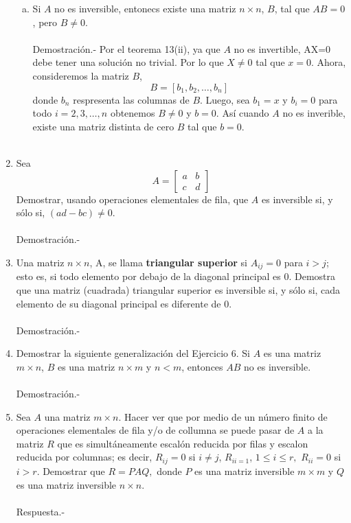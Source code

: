 \begin{enumerate}[\bfseries 1.]
\begin{enumerate}[(a)]
	    \item Si $A$ no es inversible, entonecs existe una matriz $n\times n$, $B$, tal que $AB=0$, pero $B\neq 0$.\\\\
		Demostración.-\; Por el teorema 13(ii), ya que $A$ no es invertible, AX=0 debe tener una solución no trivial. Por lo que $X\neq 0$ tal que $x=0$. Ahora, consideremos la matriz $B$,
		$$B=\left[b_1,b_2,\ldots,b_n\right]$$
		donde $b_n$ respresenta las columnas de $B$. Luego, sea $b_1=x$ y $b_i=0$ para todo $i=2,3,\ldots,n$ obtenemos $B\neq 0$ y $b=0.$ Así cuando $A$ no es inverible, existe una matriz distinta de cero $B$ tal que $b=0$.\\\\

	\end{enumerate}

    \item Sea
    $$
    A=
    \left[
	\begin{array}{rcl}
	    a & b \\
	    c & d
	\end{array}
    \right]
    $$
    Demostrar, usando operaciones elementales de fila, que $A$ es inversible si, y sólo si, $(ad-bc)\neq 0.$\\\\
	Demostración.-\;

    \item Una matriz $n\times n$, A, se llama \textbf{triangular superior} si $A_{ij}=0$ para $i>j$; esto es, si todo elemento por debajo de la diagonal principal es $0$. Demostra que una matriz (cuadrada) triangular superior es inversible si, y sólo si, cada elemento de su diagonal principal es diferente de $0$.\\\\
	Demostración.-\;

    \item Demostrar la siguiente generalización del Ejercicio 6. Si $A$ es una matriz $m\times n$, $B$ es una matriz $n\times m$ y $n<m$, entonces $AB$ no es inversible.\\\\
	Demostración.-\;

    \item Sea $A$ una matriz $m\times n$. Hacer ver que por medio de un número finito de operaciones elementales de fila y/o de collumna se puede pasar de $A$ a la matriz $R$ que es simultáneamente escalón reducida por filas y escalon reducida por columnas; es decir, $R_{ij}=0$ si $i\neq j$, $R_{ii=1}$, $1\leq i \leq r,$ $R_{ii}=0$ si $i>r$. Demostrar que $R=PAQ,$ donde $P$ es una matriz inversible $m\times m$ y $Q$ es una matriz inversible $n\times n$.\\\\
	Respuesta.-\;


\end{enumerate}
